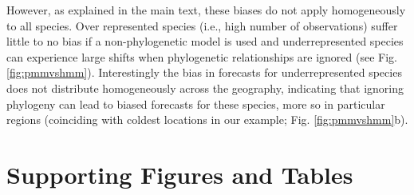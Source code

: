 \documentclass[11pt]{article}
\begin{document}
However, as explained in the main text, these biases do not apply homogeneously to all species. Over represented species (i.e., high number of observations) suffer little to no bias if a non-phylogenetic model is used and underrepresented species can experience large shifts when phylogenetic relationships are ignored (see Fig. \ref{fig:pmmvshmm}). Interestingly the bias in forecasts for underrepresented species does not distribute homogeneously across the geography, indicating that ignoring phylogeny can lead to biased forecasts for these species, more so in particular regions (coinciding with coldest locations in our example; Fig. \ref{fig:pmmvshmm}b).\\ 

\clearpage







\clearpage
\section*{Supporting Figures and Tables}
\end{document}
